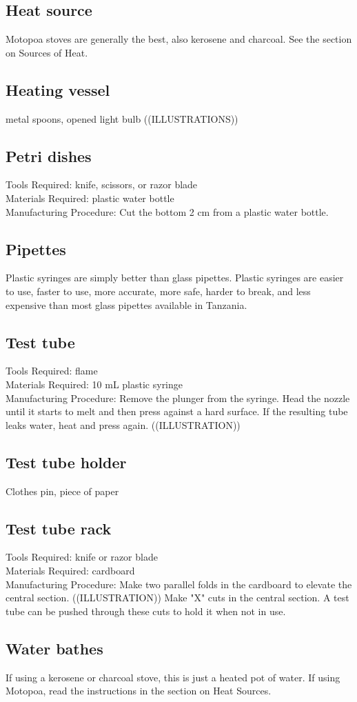 \subsection*{Heat source}
Motopoa stoves are generally the best, also kerosene and charcoal. See the section on Sources of Heat.

\subsection*{Heating vessel}
metal spoons, opened light bulb ((ILLUSTRATIONS))

\subsection*{Petri dishes}
Tools Required: knife, scissors, or razor blade\\
Materials Required: plastic water bottle\\
Manufacturing Procedure: Cut the bottom 2 cm from a plastic water bottle.

\subsection*{Pipettes}
Plastic syringes are simply better than glass pipettes. Plastic syringes are easier to use, faster to use, more accurate, more safe, harder to break, and less expensive than most glass pipettes available in Tanzania.

\subsection*{Test tube}
Tools Required: flame\\
Materials Required: 10 mL plastic syringe\\
Manufacturing Procedure: Remove the plunger from the syringe. Head the nozzle until it starts to melt and then press against a hard surface. If the resulting tube leaks water, heat and press again. ((ILLUSTRATION))

\subsection*{Test tube holder}
Clothes pin, piece of paper

\subsection*{Test tube rack}
Tools Required: knife or razor blade\\
Materials Required: cardboard\\
Manufacturing Procedure: Make two parallel folds in the cardboard to elevate the central section. ((ILLUSTRATION)) Make "X" cuts in the central section. A test tube can be pushed through these cuts to hold it when not in use.

\subsection*{Water bathes}
If using a kerosene or charcoal stove, this is just a heated pot of water. If using Motopoa, read the instructions in the section on Heat Sources.